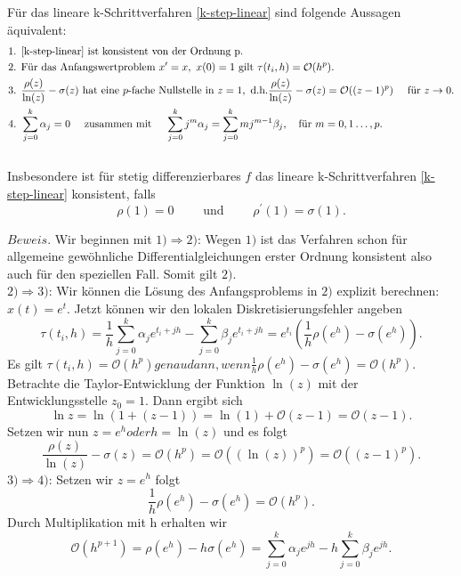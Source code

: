 \begin{satz}
    Für das lineare k-Schrittverfahren \eqref{k-step-linear} sind folgende Aussagen äquivalent:
    \begin{align*}
        &\text{1. } \eqref{k-step-linear} \text{ ist konsistent von der Ordnung p.}\\
        &\text{2. Für das Anfangswertproblem }
            x^{\prime} = x, \text{ }
            x(0) = 1
        \text{ gilt } \tau(t_i,h) = \mathcal{O}(h^p).\\
        &\text{3. } \frac{\rho(z)}{\ln(z)} - \sigma(z) \text{ hat eine $p$-fache Nullstelle in } z= 1, \text{ d.h.}
            \frac{\rho(z)}{\ln(z)} - \sigma(z) = \mathcal{O}((z-1)^p) \quad \text{ für } z \rightarrow 0.\\
        &\text{4. } \sum_{j=0}^{k} \alpha_j = 0 \quad \text{ zusammen mit } \quad
        \sum_{j=0}^{k} j^m \alpha_j = \sum_{j=0}^{k} mj^{m-1} \beta_j,  \quad \text{für } m=0,1 \dots, p.
    \end{align*}\\
    Insbesondere ist für stetig differenzierbares $f$ das lineare k-Schrittverfahren \eqref{k-step-linear} konsistent,
    falls
    \[
        \rho(1) = 0 \qquad \text{ und } \qquad \rho^{\prime}(1)=\sigma(1).
    \]
\end{satz}
$Beweis.$ Wir beginnen mit $1) \Rightarrow 2)$: Wegen $1)$ ist das Verfahren schon für allgemeine gewöhnliche
Differentialgleichungen erster Ordnung konsistent also auch für den speziellen Fall. Somit gilt $2)$.\\
$2) \Rightarrow 3)$: Wir können die Lösung des Anfangsproblems in $2)$ explizit berechnen: $x(t)=e^{t}$. Jetzt können
wir den lokalen Diskretisierungsfehler angeben
\[
    \tau(t_i,h)= \frac{1}{h} \sum_{j=0}^{k} \alpha_j e^{t_i+jh} - \sum_{j=0}^{k} \beta_j e^{t_i+jh}
    = e^{t_i} \left( \frac{1}{h} \rho(e^h) - \sigma(e^{h}) \right).
\]
Es gilt $\tau(t_i,h)= \mathcal{O}(h^p) genau dann, wenn \frac{1}{h} \rho(e^h) - \sigma(e^h) = \mathcal{O}(h^p)$.
Betrachte die Taylor-Entwicklung der Funktion $\ln(z)$ mit der Entwicklungsstelle $z_0 = 1$. Dann ergibt sich
\[
    \ln z = \ln (1 + (z-1)) = \ln(1) + \mathcal{O}(z-1) = \mathcal{O}(z-1).
\]
Setzen wir nun $z=e^h oder h=\ln(z)$ und es folgt
\[
    \frac{\rho(z)}{\ln(z)} - \sigma(z) = \mathcal{O}(h^p) = \mathcal{O}((\ln(z))^p) = \mathcal{O}((z-1)^p).
\]
$3) \Rightarrow 4)$: Setzen wir $z=e^h$ folgt
\[
    \frac{1}{h} \rho(e^h) - \sigma(e^h) = \mathcal{O}(h^p).
\]
Durch Multiplikation mit h erhalten wir
\[
    \mathcal{O}(h^{p+1}) = \rho(e^h) - h \sigma(e^h) = \sum_{j=0}^{k} \alpha_j e^{jh} - h \sum_{j=0}^{k} \beta_j e^{jh}.
\]
